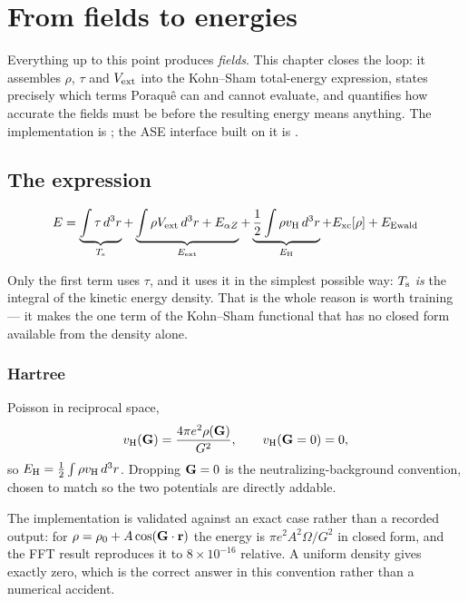 \chapter{From fields to energies}
\label{ch:energies}

Everything up to this point produces \emph{fields}. This chapter closes the
loop: it assembles $\rho$, $\tau$ and $V_{\mathrm{ext}}$ into the Kohn--Sham total-energy
expression, states precisely which terms Poraqu\^e can and cannot evaluate, and
quantifies how accurate the fields must be before the resulting energy means
anything. The implementation is ; the ASE
interface built on it is .

\section{The expression}

\begin{equation}
  E = \underbrace{\int\tau\,d^3r}_{T_{\mathrm{s}}}
    + \underbrace{\int\rho V_{\mathrm{ext}}\,d^3r + E_{\alpha Z}}_{E_{\rm ext}}
    + \underbrace{\frac12\int\rho v_{\mathrm{H}}\,d^3r}_{E_{\rm H}}
    + E_{\rm xc}[\rho]
    + E_{\rm Ewald}
  \label{eq:total-energy}
\end{equation}

Only the first term uses $\tau$, and it uses it in the simplest possible way:
$T_{\mathrm{s}}$ \emph{is} the integral of the kinetic energy density. That is the whole
reason  is worth training --- it makes the one term of the
Kohn--Sham functional that has no closed form available from the density alone.

\subsection{Hartree}

Poisson in reciprocal space,
\begin{equation}
  v_{\mathrm{H}}(\mathbf{G}) = \frac{4\pi e^2\rho(\mathbf{G})}{G^2},
  \qquad v_{\mathrm{H}}(\mathbf{G} = 0) = 0 ,
\end{equation}
so $E_{\rm H} = \frac12\int\rho v_{\mathrm{H}}\,d^3r$. Dropping $\mathbf{G} = 0$ is the
neutralizing-background convention, chosen to match
 so the two potentials are directly addable.

\begin{ptip}
The implementation is validated against an exact case rather than a recorded
output: for $\rho = \rho_0 + A\cos(\mathbf{G}\cdot\mathbf{r})$ the energy is
$\pi e^2A^2\Omega/G^2$ in closed form, and the FFT result reproduces it to
$8\times10^{-16}$ relative. A uniform density gives exactly zero, which is the
correct answer in this convention rather than a numerical accident.
\end{ptip}

